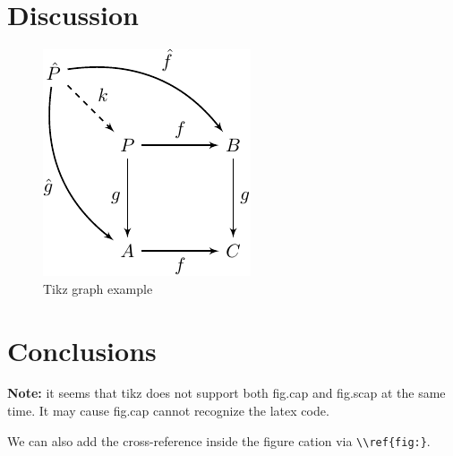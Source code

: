 \documentclass[
	letterpaper,
	DIV=11,
	numbers=noendperiod]{scrartcl}
\begin{document}
\hypertarget{discussion}{%
	\section{Discussion}\label{discussion}}

\begin{figure}

	{\centering \includegraphics{figures/simpletikz-1.pdf}

	}

	\caption{Tikz graph example}

\end{figure}

\hypertarget{conclusions}{%
	\section{Conclusions}\label{conclusions}}

\textbf{Note:} it seems that tikz does not support both fig.cap and
fig.scap at the same time. It may cause fig.cap cannot recognize the
latex code.

We can also add the cross-reference inside the figure cation via
\texttt{\textbackslash{}\textbackslash{}ref\{fig:\}}.

\clearpage


\printbibliography[title=References]
\end{document}

